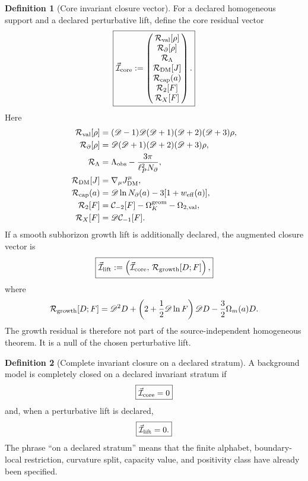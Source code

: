 \documentclass[aps,prd,reprint,nofootinbib,superscriptaddress,floatfix]{revtex4-2}
\numberwithin{equation}{section}
\theoremstyle{definition}
\newtheorem{definition}{Definition}[section]
\theoremstyle{plain}
\newcommand{\Dil}{\mathscr D}
\newcommand{\Ncap}{N_{\partial}}
\begin{document}
\begin{definition}[Core invariant closure vector]\label{def:closure-vector}
For a declared homogeneous support and a declared perturbative lift, define
the core residual vector
\begin{equation}
\boxed{
\vec{\mathcal I}_{\rm core}
:=
\begin{pmatrix}
\mathcal R_{\rm val}[\rho]\\
\mathcal R_{\partial}[\rho]\\
\mathcal R_\Lambda\\
\mathcal R_{\rm DM}[J]\\
\mathcal R_{\rm cap}(a)\\
\mathcal R_{2}[F]\\
\mathcal R_X[F]
\end{pmatrix}.
}
\end{equation}
Here
\begin{align}
\mathcal R_{\rm val}[\rho]
&=(\Dil-1)\Dil(\Dil+1)(\Dil+2)(\Dil+3)\rho,\\
\mathcal R_{\partial}[\rho]
&=\Dil(\Dil+1)(\Dil+2)(\Dil+3)\rho,\\
\mathcal R_\Lambda
&=\Lambda_{\rm obs}-\frac{3\pi}{\ell_P^2\Ncap},\\
\mathcal R_{\rm DM}[J]
&=\nabla_\mu J^\mu_{\rm DM},\\
\mathcal R_{\rm cap}(a)
&=\Dil\ln N_\partial(a)-3[1+w_{\rm eff}(a)],\\
\mathcal R_2[F]
&=\mathcal C_{-2}[F]-\Omega_K^{\rm geom}-\Omega_{2,\rm val},\\
\mathcal R_X[F]
&=\Dil\mathcal C_{-1}[F].
\end{align}
If a smooth subhorizon growth lift is additionally declared, the augmented
closure vector is
\begin{equation}
\boxed{
\vec{\mathcal I}_{\rm lift}
:=
\left(\vec{\mathcal I}_{\rm core},\,
\mathcal R_{\rm growth}[D;F]\right),
}
\end{equation}
where
\begin{equation}
\mathcal R_{\rm growth}[D;F]
=
\Dil^2D+
\left(2+\frac12\Dil\ln F\right)\Dil D
-\frac32\Omega_m(a)D.
\end{equation}
The growth residual is therefore not part of the source-independent
homogeneous theorem.  It is a null of the chosen perturbative lift.
\end{definition}

\begin{definition}[Complete invariant closure on a declared stratum]
A background model is completely closed on a declared invariant stratum if
\begin{equation}
\boxed{\vec{\mathcal I}_{\rm core}=0}
\end{equation}
and, when a perturbative lift is declared,
\begin{equation}
\boxed{\vec{\mathcal I}_{\rm lift}=0.}
\end{equation}
The phrase ``on a declared stratum'' means that the finite alphabet,
boundary-local restriction, curvature split, capacity value, and positivity
class have already been specified.
\end{definition}
\end{document}
